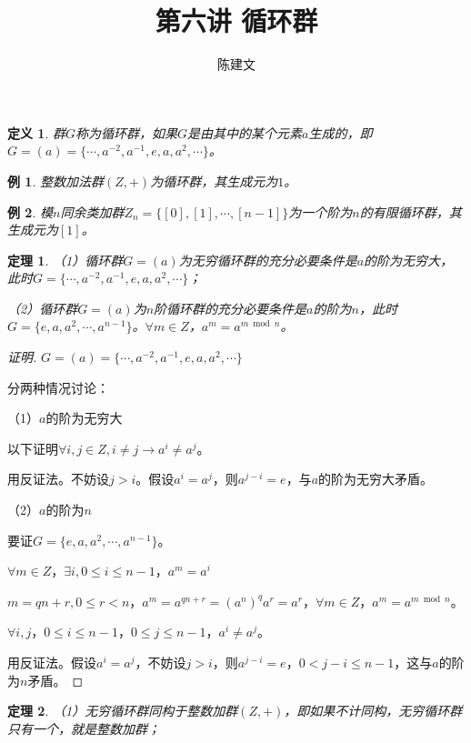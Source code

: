 \documentclass{article}
\newtheorem{Def}{定义}
\newtheorem{Thm}{定理}
\newtheorem*{Example}{例}
\begin{document}
\begin{CJK*}{UTF8}{gbsn}
  \title{第六讲 循环群}
  \author{陈建文}
  \maketitle
  
\begin{Def}
  群$G$称为循环群，如果$G$是由其中的某个元素$a$生成的，即$G=(a)=\{\cdots,a^{-2},a^{-1},e,a,a^2,\cdots\}$。
\end{Def}

\begin{Example}
  整数加法群$(Z,+)$为循环群，其生成元为$1$。
\end{Example}

\begin{Example}
  模$n$同余类加群$Z_n=\{[0],[1],\cdots,[n-1]\}$为一个阶为$n$的有限循环群，其生成元为$[1]$。
\end{Example}

\begin{Thm}
  （1）循环群$G=(a)$为无穷循环群的充分必要条件是$a$的阶为无穷大，此时$G=\{\cdots,a^{-2},a^{-1},e,a,a^2,\cdots\}$；
  
  （2）循环群$G=(a)$为$n$阶循环群的充分必要条件是$a$的阶为$n$，此时$G=\{e,a,a^2,\cdots,a^{n-1}\}$。$\forall m\in Z$，$a^m=a^{m\bmod n}$。
\end{Thm}
\begin{proof}[证明]
  $G=(a)=\{\cdots,a^{-2},a^{-1},e,a,a^2,\cdots\}$

  分两种情况讨论：

  （1）$a$的阶为无穷大

  以下证明$\forall i,j\in Z,i\neq j\to a^i\neq a^j$。

  用反证法。不妨设$j>i$。假设$a^i=a^j$，则$a^{j-i}=e$，与$a$的阶为无穷大矛盾。

  （2）$a$的阶为$n$

  要证$G=\{e,a,a^2,\cdots,a^{n-1}\}$。

  $\forall m\in Z$，$\exists i,0\leq i \leq n-1$，$a^m=a^i$

  $m=qn+r,0\leq r < n$，$a^m=a^{qn+r}=(a^n)^qa^r=a^r$，$\forall m\in Z$，$a^m=a^{m\bmod n}$。

  $\forall i,j$，$0\leq i\leq n-1$，$0\leq j \leq n-1$，$a^i\neq a^j$。

  用反证法。假设$a^i=a^j$，不妨设$j>i$，则$a^{j-i}=e$，$0<j-i\leq n-1$，这与$a$的阶为$n$矛盾。
\end{proof}
\begin{Thm}
  （1）无穷循环群同构于整数加群$(Z,+)$，即如果不计同构，无穷循环群只有一个，就是整数加群；
  

\end{Thm}
\end{CJK*}
\end{document}

